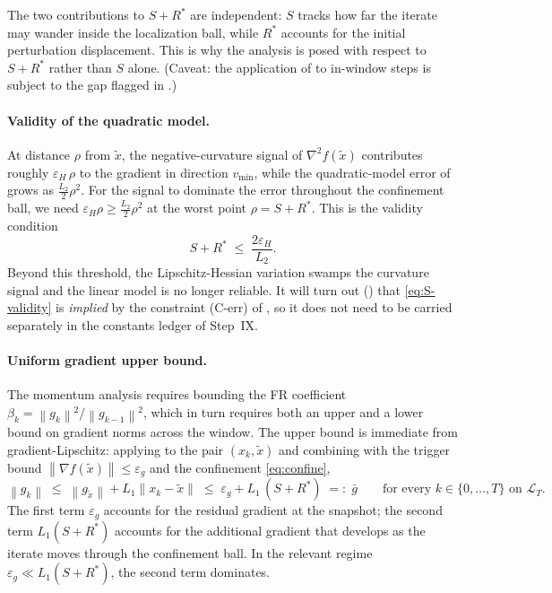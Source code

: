 \documentclass[11pt,a4paper]{article}
\theoremstyle{plain}
\theoremstyle{definition}
\newcommand{\norm}[1]{\left\|#1\right\|}
\newcommand{\eps}{\varepsilon}
\newcommand{\epsg}{\eps_{g}}
\newcommand{\epsH}{\eps_{H}}
\newcommand{\grad}{\nabla}
\newcommand{\hess}{\nabla^{2}}
\newcommand{\Lone}{L_{1}}
\newcommand{\Ltwo}{L_{2}}
\newcommand{\snap}{\tilde{x}}
\newcommand{\vmin}{v_{\min}}
\newcommand{\Rstar}{R^{*}}
\newcommand{\gup}{\bar g}
\begin{document}
The two contributions to $S+\Rstar$ are independent: $S$ tracks how far the
iterate may wander inside the localization ball, while $\Rstar$ accounts for
the initial perturbation displacement. This is why the analysis is posed
with respect to $S+\Rstar$ rather than $S$ alone.
(Caveat: the application of  to in-window steps is subject to
the gap flagged in .)

\paragraph{Validity of the quadratic model.}
At distance $\rho$ from $\snap$, the negative-curvature signal of $\hess
f(\snap)$ contributes roughly $\epsH\,\rho$ to the gradient in direction
$\vmin$, while the quadratic-model error of  grows as
$\tfrac{\Ltwo}{2}\rho^2$. For the signal to dominate the error throughout
the confinement ball, we need $\epsH\rho \ge \tfrac{\Ltwo}{2}\rho^2$ at the
worst point $\rho = S+\Rstar$. This is the validity condition
\begin{equation}\label{eq:S-validity}
S + \Rstar \;\le\; \frac{2\epsH}{\Ltwo}.
\tag{C-valid}
\end{equation}
Beyond this threshold, the Lipschitz-Hessian variation swamps the curvature
signal and the linear model is no longer reliable. It will turn out
() that \eqref{eq:S-validity} is \emph{implied} by the
constraint (C-err) of , so it does not need to be carried
separately in the constants ledger of Step~IX.

\paragraph{Uniform gradient upper bound.}
The momentum analysis requires bounding the FR coefficient $\beta_k =
\norm{g_k}^2/\norm{g_{k-1}}^2$, which in turn requires both an upper and a
lower bound on gradient norms across the window. The upper bound is
immediate from gradient-Lipschitz: applying  to the pair
$(x_k, \snap)$ and combining with the trigger bound $\norm{\grad
f(\snap)}\le\epsg$ and the confinement \eqref{eq:confine},
\begin{equation}\label{eq:barg-def}
\norm{g_k}
\;\le\; \norm{g_{\snap}} + \Lone\norm{x_{k}-\snap}
\;\le\; \epsg + \Lone\,(S+\Rstar) \;=:\; \gup
\qquad\text{for every }k\in\{0,\dots,T\}\text{ on }\mathcal{L}_T.
\end{equation}
The first term $\epsg$ accounts for the residual gradient at the snapshot;
the second term $\Lone(S+\Rstar)$ accounts for the additional gradient that
develops as the iterate moves through the confinement ball. In the relevant
regime $\epsg \ll \Lone(S+\Rstar)$, the second term dominates.
\end{document}
